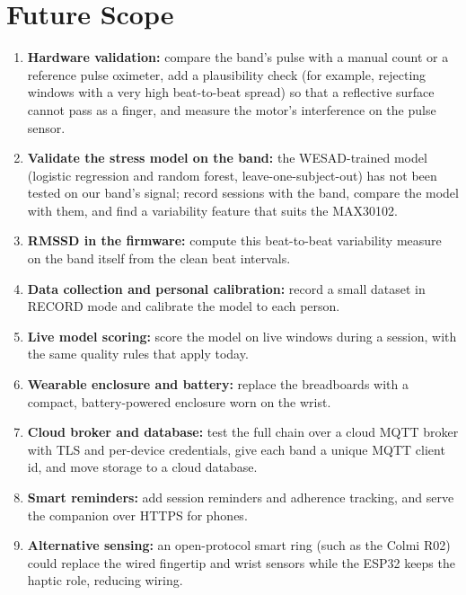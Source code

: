 \documentclass[12pt,letterpaper,oneside]{report}
\begin{document}
\section{Future Scope}\label{sec:7.2}

\begin{enumerate}\item \textbf{Hardware validation:} compare the band's pulse with a manual count or a reference pulse oximeter, add a plausibility check (for example, rejecting windows with a very high beat-to-beat spread) so that a reflective surface cannot pass as a finger, and measure the motor's interference on the pulse sensor.
\item \textbf{Validate the stress model on the band:} the WESAD-trained model (logistic regression and random forest, leave-one-subject-out) has not been tested on our band's signal; record sessions with the band, compare the model with them, and find a variability feature that suits the MAX30102.
\item \textbf{RMSSD in the firmware:} compute this beat-to-beat variability measure on the band itself from the clean beat intervals.
\item \textbf{Data collection and personal calibration:} record a small dataset in RECORD mode and calibrate the model to each person.
\item \textbf{Live model scoring:} score the model on live windows during a session, with the same quality rules that apply today.
\item \textbf{Wearable enclosure and battery:} replace the breadboards with a compact, battery-powered enclosure worn on the wrist.
\item \textbf{Cloud broker and database:} test the full chain over a cloud MQTT broker with TLS and per-device credentials, give each band a unique MQTT client id, and move storage to a cloud database.
\item \textbf{Smart reminders:} add session reminders and adherence tracking, and serve the companion over HTTPS for phones.
\item \textbf{Alternative sensing:} an open-protocol smart ring (such as the Colmi R02) could replace the wired fingertip and wrist sensors while the ESP32 keeps the haptic role, reducing wiring.
\end{enumerate}
\end{document}
